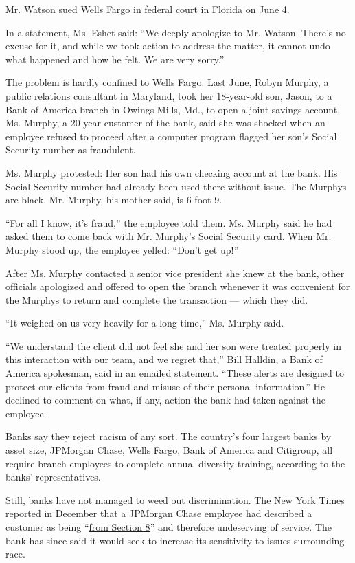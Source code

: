 Mr. Watson sued Wells Fargo in federal court in Florida on June 4.

In a statement, Ms. Eshet said: ``We deeply apologize to Mr. Watson.
There's no excuse for it, and while we took action to address the
matter, it cannot undo what happened and how he felt. We are very
sorry.''

The problem is hardly confined to Wells Fargo. Last June, Robyn Murphy,
a public relations consultant in Maryland, took her 18-year-old son,
Jason, to a Bank of America branch in Owings Mills, Md., to open a joint
savings account. Ms. Murphy, a 20-year customer of the bank, said she
was shocked when an employee refused to proceed after a computer program
flagged her son's Social Security number as fraudulent.

Ms. Murphy protested: Her son had his own checking account at the bank.
His Social Security number had already been used there without issue.
The Murphys are black. Mr. Murphy, his mother said, is 6-foot-9.

``For all I know, it's fraud,'' the employee told them. Ms. Murphy said
he had asked them to come back with Mr. Murphy's Social Security card.
When Mr. Murphy stood up, the employee yelled: ``Don't get up!''

After Ms. Murphy contacted a senior vice president she knew at the bank,
other officials apologized and offered to open the branch whenever it
was convenient for the Murphys to return and complete the transaction
--- which they did.

``It weighed on us very heavily for a long time,'' Ms. Murphy said.

``We understand the client did not feel she and her son were treated
properly in this interaction with our team, and we regret that,'' Bill
Halldin, a Bank of America spokesman, said in an emailed statement.
``These alerts are designed to protect our clients from fraud and misuse
of their personal information.'' He declined to comment on what, if any,
action the bank had taken against the employee.

Banks say they reject racism of any sort. The country's four largest
banks by asset size, JPMorgan Chase, Wells Fargo, Bank of America and
Citigroup, all require branch employees to complete annual diversity
training, according to the banks' representatives.

Still, banks have not managed to weed out discrimination. The New York
Times reported in December that a JPMorgan Chase employee had described
a customer as being
``\href{https://www.nytimes3xbfgragh.onion/2019/12/11/business/jpmorgan-banking-racism.html}{from
Section 8}'' and therefore undeserving of service. The bank has since
said it would seek to increase its sensitivity to issues surrounding
race.


